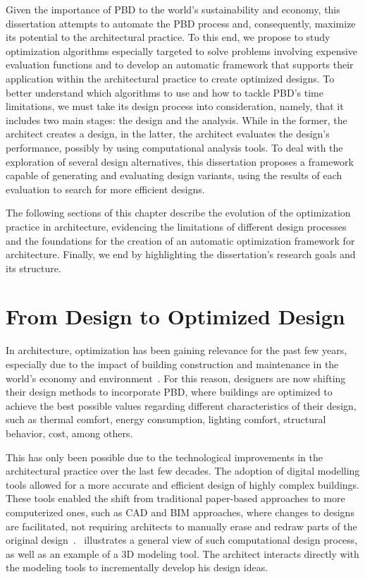 	Given the importance of \ac{PBD} to the world's sustainability and economy, this dissertation attempts to automate the \ac{PBD} process and, consequently, maximize its potential to the architectural practice. To this end, we propose to study optimization algorithms especially targeted to solve problems involving expensive evaluation functions and to develop an automatic framework that supports their application within the architectural practice to create optimized designs. To better understand which algorithms to use and how to tackle \ac{PBD}'s time limitations, we must take its design process into consideration, namely, that it includes two main stages: the design and the analysis. While in the former, the architect creates a design, in the latter, the architect evaluates the design's performance, possibly by using computational analysis tools. To deal with the exploration of several design alternatives, this dissertation proposes a framework capable of generating and evaluating design variants, using the results of each evaluation to search for more efficient designs.
	
	The following sections of this chapter describe the evolution of the optimization practice in architecture, evidencing the limitations of different design processes and the foundations for the creation of an automatic optimization framework for architecture. Finally, we end by highlighting the dissertation's research goals and its structure.

\section{From Design to Optimized Design}
	
	In architecture, optimization has been gaining relevance for the past few years, especially due to the impact of building construction and maintenance in the world's economy and environment~\cite{Attia2013, Shi2016}. For this reason, designers are now shifting their design methods to incorporate \ac{PBD}, where buildings are optimized to achieve the best possible values regarding different characteristics of their design, such as thermal comfort, energy consumption, lighting comfort, structural behavior, cost, among others.

	This has only been possible due to the technological improvements in the architectural practice over the last few decades. The adoption of digital modelling tools allowed for a more accurate and efficient design of highly complex buildings. These tools enabled the shift from traditional paper-based approaches to more computerized ones, such as \ac{CAD} and \ac{BIM} approaches, where changes to designs are facilitated, not requiring architects to manually erase and redraw parts of the original design~\cite{Ferreira2015GD}.~ illustrates a general view of such computational design process, as well as an example of a 3D modeling tool. The architect interacts directly with the modeling tools to incrementally develop his design ideas.
	
